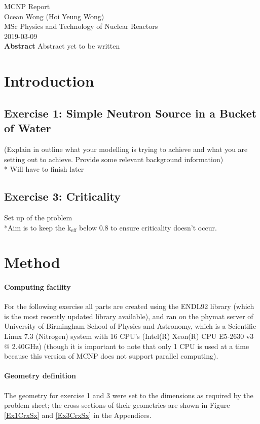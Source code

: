 \documentclass[a4paper, 12pt]{article}
\begin{document}
\begin{center}
MCNP Report										\\
Ocean Wong (Hoi Yeung Wong)						\\
MSc Physics and Technology of Nuclear Reactors	\\
2019-03-09 										\\
\textbf{Abstract}
Abstract yet to be written
\end{center}

\section{Introduction}
\subsection{Exercise 1: Simple Neutron Source in a Bucket of Water}
(Explain in outline what your modelling is trying to achieve and what you are setting out to achieve. Provide some relevant background information)
\\* Will have to finish later
\subsection{Exercise 3: Criticality}
Set up of the problem
\\*Aim is to keep the $\text{k}_{\text{eff}}$ below 0.8 to ensure criticality doesn't occur.

\section{Method}
\paragraph{Computing facility} For the following exercise all parts are created using the ENDL92 library (which is the most recently updated library available), and ran on the phymat server of University of Birmingham School of Physics and Astronomy, which is a Scientific Linux 7.3 (Nitrogen) system with 16 CPU's (Intel(R) Xeon(R) CPU E5-2630 v3 @ 2.40GHz) (though it is important to note that only 1 CPU is used at a time because this version of MCNP does not support parallel computing). 
\paragraph{Geometry definition} The geometry for exercise 1 and 3 were set to the dimensions as required by the problem sheet; the cross-sections of their geometries are shown in Figure \ref{Ex1CrxSx} and \ref{Ex3CrxSx} in the Appendices.
\end{document}

